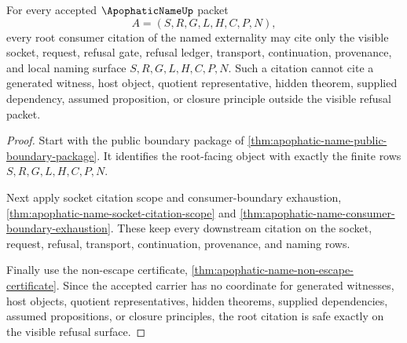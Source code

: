 \begin{theorem}
\label{thm:apophatic-name-root-citation-safety}
For every accepted $\ApophaticNameUp$ packet
$$
A=(S,R,G,L,H,C,P,N),
$$
every root consumer citation of the named externality may cite only the visible socket, request, refusal gate, refusal ledger, transport, continuation, provenance, and local naming surface $S,R,G,L,H,C,P,N$. Such a citation cannot cite a generated witness, host object, quotient representative, hidden theorem, supplied dependency, assumed proposition, or closure principle outside the visible refusal packet.
\end{theorem}
\begin{proof}
Start with the public boundary package of \autoref{thm:apophatic-name-public-boundary-package}. It identifies the root-facing object with exactly the finite rows $S,R,G,L,H,C,P,N$.

Next apply socket citation scope and consumer-boundary exhaustion, \autoref{thm:apophatic-name-socket-citation-scope} and \autoref{thm:apophatic-name-consumer-boundary-exhaustion}. These keep every downstream citation on the socket, request, refusal, transport, continuation, provenance, and naming rows.

Finally use the non-escape certificate, \autoref{thm:apophatic-name-non-escape-certificate}. Since the accepted carrier has no coordinate for generated witnesses, host objects, quotient representatives, hidden theorems, supplied dependencies, assumed propositions, or closure principles, the root citation is safe exactly on the visible refusal surface.
\end{proof}

